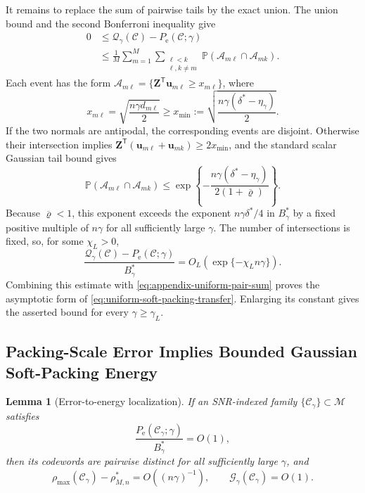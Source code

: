 \documentclass[12pt,draftclsnofoot,onecolumn]{IEEEtran}
\newcommand{\Pp}{\mathbb{P}}
\newcommand{\cA}{\mathcal{A}}
\newcommand{\cC}{\mathcal{C}}
\newcommand{\cG}{\mathcal{G}}
\newcommand{\cM}{\mathcal{M}}
\newcommand{\cQ}{\mathcal{Q}}
\newcommand{\Pe}{P_{\mathrm e}}
\newcommand{\bZ}{\bm Z}
\newcommand{\bu}{\bm u}
\newcommand{\T}{\mathsf T}
\newtheorem{lemma}{Lemma}
\theoremstyle{definition}
\begin{document}
\begin{IEEEproof}
It remains to replace the sum of pairwise tails by the exact union.  The
union bound and the second Bonferroni inequality
\cite[Ch.~1]{GalambosSimonelli1996} give
\begin{equation*}
\begin{split}
  0&\le \cQ_\gamma(\cC)-\Pe(\cC;\gamma)\\
  &\le\frac1M\sum_{m=1}^M
  \sum_{\substack{\ell<k\\ \ell,k\ne m}}
  \Pp(\cA_{m\ell}\cap \cA_{mk}).
\end{split}
\end{equation*}
Each event has the form
\(\cA_{m\ell}=\{\bZ^{\T}\bu_{m\ell}\ge x_{m\ell}\}\), where
\begin{equation*}
  x_{m\ell}=\sqrt{\frac{n\gamma d_{m\ell}}2}
  \ge x_{\min}
  :=\sqrt{\frac{n\gamma(\delta^{\ast}-\eta_\gamma)}2}.
\end{equation*}
If the two normals are antipodal, the corresponding events are
disjoint.  Otherwise their intersection implies
\(\bZ^{\T}(\bu_{m\ell}+\bu_{mk})\ge2x_{\min}\), and the standard scalar
Gaussian tail bound \cite{Proakis2001} gives
\begin{equation*}
  \Pp(\cA_{m\ell}\cap \cA_{mk})
  \le\exp\left\{-\frac{n\gamma(\delta^{\ast}-\eta_\gamma)}
  {2(1+\overline\varrho)}\right\}.
\end{equation*}
Because \(\overline\varrho<1\), this exponent exceeds the exponent
\(n\gamma\delta^{\ast}/4\) in \(B_\gamma^{\ast}\) by a fixed positive
multiple of \(n\gamma\) for all sufficiently large \(\gamma\).  The
number of intersections is fixed, so, for some \(\chi_L>0\),
\begin{equation*}
  \frac{\cQ_\gamma(\cC)-\Pe(\cC;\gamma)}{B_\gamma^{\ast}}
  =O_L(\exp\{-\chi_L n\gamma\}).
\end{equation*}
Combining this estimate with
\eqref{eq:appendix-uniform-pair-sum} proves the asymptotic form of
\eqref{eq:uniform-soft-packing-transfer}.  Enlarging its constant gives
the asserted bound for every \(\gamma\ge\gamma_L\).
\end{IEEEproof}



\subsection{Packing-Scale Error Implies Bounded Gaussian Soft-Packing Energy}

\begin{lemma}[Error-to-energy localization]
\label{lem:error-to-energy-localization}
If an SNR-indexed family \(\{\cC_\gamma\}\subset\cM\) satisfies
\begin{equation*}
  \frac{\Pe(\cC_\gamma;\gamma)}{B_\gamma^{\ast}}=O(1),
\end{equation*}
then its codewords are pairwise distinct for all sufficiently large
\(\gamma\), and
\begin{equation}
  \rho_{\max}(\cC_\gamma)-\rho^{\ast}_{M,n}
  =O((n\gamma)^{-1}),
  \qquad
  \cG_\gamma(\cC_\gamma)=O(1).
  \label{eq:error-to-energy-localization}
\end{equation}
\end{lemma}
\end{document}
